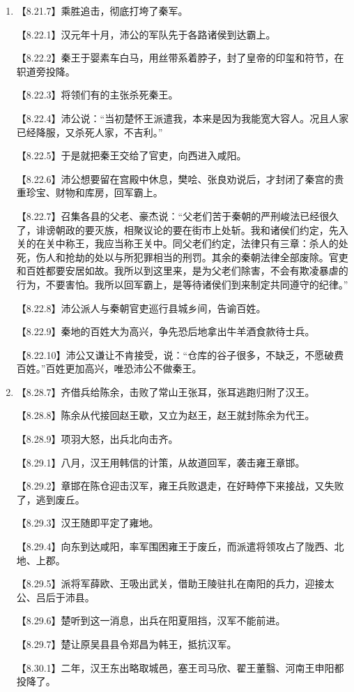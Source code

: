 \documentclass[fontset=none,11pt,a4paper]{ctexart}
\begin{document}
\begin{enumerate}[label=\Alph*.]
\noindent 【8.17.1】赵多次请求救援，楚怀王就以宋义为上将军，项羽为次将，范增为未将，北上救赵。\par
\noindent 【8.17.2】命令沛公西出略地，打入关中。\par
  \item
\noindent 【8.21.7】乘胜追击，彻底打垮了秦军。\par
\noindent 【8.22.1】汉元年十月，沛公的军队先于各路诸侯到达霸上。\par
\noindent 【8.22.2】秦王于婴素车白马，用丝带系着脖子，封了皇帝的印玺和符节，在轵道旁投降。\par
\noindent 【8.22.3】将领们有的主张杀死秦王。\par
\noindent 【8.22.4】沛公说：“当初楚怀王派遣我，本来是因为我能宽大容人。况且人家已经降服，又杀死人家，不吉利。”\par
\noindent 【8.22.5】于是就把秦王交给了官吏，向西进入咸阳。\par
\noindent 【8.22.6】沛公想要留在宫殿中休息，樊哙、张良劝说后，才封闭了秦宫的贵重珍宝、财物和库房，回军霸上。\par
\noindent 【8.22.7】召集各县的父老、豪杰说：“父老们苦于秦朝的严刑峻法已经很久了，诽谤朝政的要灭族，相聚议论的要在街市上处斩。我和诸侯们约定，先入关的在关中称王，我应当称王关中。同父老们约定，法律只有三章：杀人的处死，伤人和抢劫的处以与所犯罪相当的刑罚。其余的秦朝法律全部废除。官吏和百姓都要安居如故。我所以到这里来，是为父老们除害，不会有欺凌暴虐的行为，不要害怕。我所以回军霸上，是等待诸侯们到来制定共同遵守的纪律。”\par
\noindent 【8.22.8】沛公派人与秦朝官吏巡行县城乡间，告谕百姓。\par
\noindent 【8.22.9】秦地的百姓大为高兴，争先恐后地拿出牛羊酒食款待士兵。\par
\noindent 【8.22.10】沛公又谦让不肯接受，说：“仓库的谷子很多，不缺乏，不愿破费百姓。”百姓更加高兴，唯恐沛公不做秦王。\par
  \item
\noindent 【8.28.7】齐借兵给陈余，击败了常山王张耳，张耳逃跑归附了汉王。\par
\noindent 【8.28.8】陈余从代接回赵王歇，又立为赵王，赵王就封陈余为代王。\par
\noindent 【8.28.9】项羽大怒，出兵北向击齐。\par
\noindent 【8.29.1】八月，汉王用韩信的计策，从故道回军，袭击雍王章邯。\par
\noindent 【8.29.2】章邯在陈仓迎击汉军，雍王兵败退走，在好畤停下来接战，又失败了，逃到废丘。\par
\noindent 【8.29.3】汉王随即平定了雍地。\par
\noindent 【8.29.4】向东到达咸阳，率军围困雍王于废丘，而派遣将领攻占了陇西、北地、上郡。\par
\noindent 【8.29.5】派将军薛欧、王吸出武关，借助王陵驻扎在南阳的兵力，迎接太公、吕后于沛县。\par
\noindent 【8.29.6】楚听到这一消息，出兵在阳夏阻挡，汉军不能前进。\par
\noindent 【8.29.7】楚让原吴县县令郑昌为韩王，抵抗汉军。\par
\noindent 【8.30.1】二年，汉王东出略取城邑，塞王司马欣、翟王董翳、河南王申阳都投降了。\par
\end{enumerate}
\end{document}
